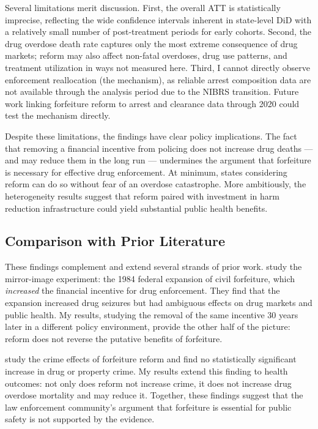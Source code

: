\documentclass[12pt]{article}
\begin{document}
Several limitations merit discussion. First, the overall ATT is statistically imprecise, reflecting the wide confidence intervals inherent in state-level DiD with a relatively small number of post-treatment periods for early cohorts. Second, the drug overdose death rate captures only the most extreme consequence of drug markets; reform may also affect non-fatal overdoses, drug use patterns, and treatment utilization in ways not measured here. Third, I cannot directly observe enforcement reallocation (the mechanism), as reliable arrest composition data are not available through the analysis period due to the NIBRS transition. Future work linking forfeiture reform to arrest and clearance data through 2020 could test the mechanism directly.

Despite these limitations, the findings have clear policy implications. The fact that removing a financial incentive from policing does not increase drug deaths --- and may reduce them in the long run --- undermines the argument that forfeiture is necessary for effective drug enforcement. At minimum, states considering reform can do so without fear of an overdose catastrophe. More ambitiously, the heterogeneity results suggest that reform paired with investment in harm reduction infrastructure could yield substantial public health benefits.

\subsection{Comparison with Prior Literature}

These findings complement and extend several strands of prior work. \citet{kantor2021enforcement} study the mirror-image experiment: the 1984 federal expansion of civil forfeiture, which \textit{increased} the financial incentive for drug enforcement. They find that the expansion increased drug seizures but had ambiguous effects on drug markets and public health. My results, studying the removal of the same incentive 30 years later in a different policy environment, provide the other half of the picture: reform does not reverse the putative benefits of forfeiture.

\citet{lee2023effects} study the crime effects of forfeiture reform and find no statistically significant increase in drug or property crime. My results extend this finding to health outcomes: not only does reform not increase crime, it does not increase drug overdose mortality and may reduce it. Together, these findings suggest that the law enforcement community's argument that forfeiture is essential for public safety is not supported by the evidence.
\end{document}

